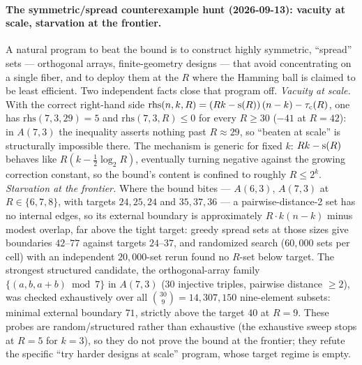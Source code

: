 \paragraph{The symmetric/spread counterexample hunt (2026-09-13):
vacuity at scale, starvation at the frontier.} A natural program to
beat the bound is to construct highly symmetric, ``spread'' sets ---
orthogonal arrays, finite-geometry designs --- that avoid concentrating
on a single fiber, and to deploy them at the $R$ where the Hamming ball
is claimed to be least efficient. Two independent facts close that
program off. \emph{Vacuity at scale.} With the correct right-hand side
$\mathrm{rhs}(n,k,R)=(Rk-\mathrm{s}(R))\,(n-k)-\tau_{\mathrm{c}}(R)$, one has
$\mathrm{rhs}(7,3,29)=5$ and $\mathrm{rhs}(7,3,R)\le 0$ for every
$R\ge 30$ ($-41$ at $R=42$): in $A(7,3)$ the inequality asserts nothing
past $R\approx 29$, so ``beaten at scale'' is structurally impossible
there. The mechanism is generic for fixed $k$: $Rk-\mathrm{s}(R)$ behaves
like $R\left(k-\tfrac12\log_2 R\right)$, eventually turning negative
against the growing correction constant, so the bound's content is
confined to roughly $R\le 2^k$. \emph{Starvation at the frontier.}
Where the bound bites --- $A(6,3)$, $A(7,3)$ at $R\in\{6,7,8\}$, with
targets $24,25,24$ and $35,37,36$ --- a pairwise-distance-2 set has no
internal edges, so its external boundary is approximately
$R\cdot k(n-k)$ minus modest overlap, far above the tight target:
greedy spread sets at those sizes give boundaries $42$--$77$ against
targets $24$--$37$, and randomized search ($60{,}000$ sets per cell)
with an independent $20{,}000$-set rerun found no $R$-set below target.
The strongest structured candidate, the orthogonal-array family
$\{(a,b,a+b)\bmod 7\}$ in $A(7,3)$ (30 injective triples, pairwise
distance $\ge 2$), was checked exhaustively over all
$\binom{30}{9}=14{,}307{,}150$ nine-element subsets: minimal external
boundary $71$, strictly above the target $40$ at $R=9$. These probes are
random/structured rather than exhaustive (the exhaustive sweep stops at
$R=5$ for $k=3$), so they do not prove the bound at the frontier; they
refute the specific ``try harder designs at scale'' program, whose
target regime is empty.

